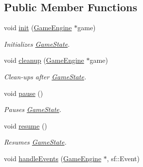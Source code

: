 \subsection*{Public Member Functions}
\begin{DoxyCompactItemize}
\item 
\mbox{\label{class_serve_state_ab39cdbf8c6fe8bbcf67d29033c3e2c15}} 
void \mbox{\hyperlink{class_serve_state_ab39cdbf8c6fe8bbcf67d29033c3e2c15}{init}} (\mbox{\hyperlink{class_game_engine}{Game\+Engine}} $\ast$game)
\begin{DoxyCompactList}\small\item\em Initializes \mbox{\hyperlink{class_game_state}{Game\+State}}. \end{DoxyCompactList}\item 
\mbox{\label{class_serve_state_a3516119feb2bf386b3686867da412328}} 
void \mbox{\hyperlink{class_serve_state_a3516119feb2bf386b3686867da412328}{cleanup}} (\mbox{\hyperlink{class_game_engine}{Game\+Engine}} $\ast$game)
\begin{DoxyCompactList}\small\item\em Clean-\/ups after \mbox{\hyperlink{class_game_state}{Game\+State}}. \end{DoxyCompactList}\item 
\mbox{\label{class_serve_state_ab3a85411b4cc260cfede50e3aa10573c}} 
void \mbox{\hyperlink{class_serve_state_ab3a85411b4cc260cfede50e3aa10573c}{pause}} ()
\begin{DoxyCompactList}\small\item\em Pauses \mbox{\hyperlink{class_game_state}{Game\+State}}. \end{DoxyCompactList}\item 
\mbox{\label{class_serve_state_ae9a501a1f103b02685fdd4caac5685e5}} 
void \mbox{\hyperlink{class_serve_state_ae9a501a1f103b02685fdd4caac5685e5}{resume}} ()
\begin{DoxyCompactList}\small\item\em Resumes \mbox{\hyperlink{class_game_state}{Game\+State}}. \end{DoxyCompactList}\item 
\mbox{\label{class_serve_state_a8f372bdf6b72e8d4ae9eaa1b45a4d844}} 
void \mbox{\hyperlink{class_serve_state_a8f372bdf6b72e8d4ae9eaa1b45a4d844}{handle\+Events}} (\mbox{\hyperlink{class_game_engine}{Game\+Engine}} $\ast$, sf\+::\+Event)

\end{DoxyCompactItemize}
